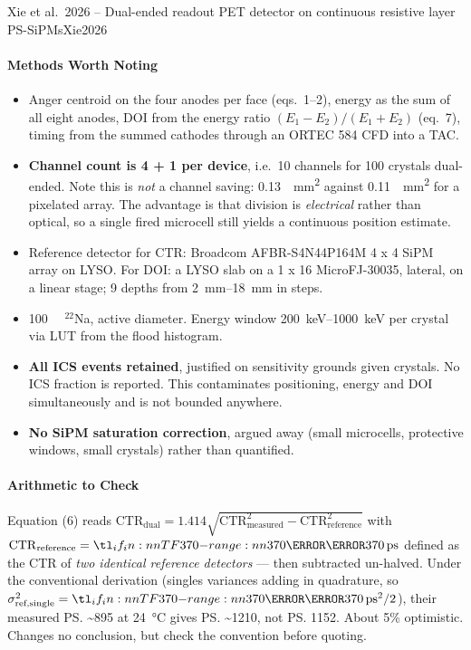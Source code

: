 \begin{papernote}{Xie et al.\ 2026 -- Dual-ended readout PET detector on continuous resistive layer PS-SiPMs}{Xie2026}
\paragraph{Methods Worth Noting}
\begin{itemize}
	\item Anger centroid on the four anodes per face (eqs.\ 1--2), energy as the
		sum of all eight anodes, DOI from the energy ratio
		$(E_1 - E_2)/(E_1 + E_2)$ (eq.\ 7), timing from the summed cathodes
		through an ORTEC 584 CFD into a TAC.
	\item \textbf{Channel count is 4 + 1 per device}, i.e.\ 10 channels for 100
		crystals dual-ended. Note this is \emph{not} a channel saving:
		\qty{0.13}{\per\milli\metre\squared} against
		\qty{0.11}{\per\milli\metre\squared} for a  pixelated array. The
		advantage is that division is \emph{electrical} rather than optical, so
		a single fired microcell still yields a continuous position estimate.
	\item Reference detector for CTR: Broadcom AFBR-S4N44P164M 4 x 4 SiPM array
		on  LYSO. For DOI: a
		 LYSO slab on a 1 x 16
		MicroFJ-30035, lateral, on a linear stage; 9 depths from
		\qtyrange{2}{18}{\milli\metre} in  steps.
	\item \qty{100}{\micro\curie} $^{22}$Na,  active diameter.
		Energy window \qtyrange{200}{1000}{\kilo\electronvolt} per crystal via
		LUT from the flood histogram.
	\item \textbf{All ICS events retained}, justified on sensitivity grounds
		given  crystals. No ICS fraction is reported. This contaminates
		positioning, energy and DOI simultaneously and is not bounded anywhere.
	\item \textbf{No SiPM saturation correction}, argued away (small microcells,
		 protective windows, small crystals) rather than quantified.
\end{itemize}
 
\paragraph{Arithmetic to Check}
Equation (6) reads
$\mathrm{CTR}_{\text{dual}} = 1.414\sqrt{\mathrm{CTR}_{\text{measured}}^2
- \mathrm{CTR}_{\text{reference}}^2}$
with $\mathrm{CTR}_{\text{reference}} = \ps{370}$ defined as the CTR of
\emph{two identical reference detectors} --- then subtracted un-halved. Under the
conventional derivation (singles variances adding in quadrature, so
$\sigma^2_{\text{ref,single}} = \ps{370}^2/2$), their measured \ps{\sim895} at
\qty{24}{\degreeCelsius} gives \ps{\sim1210}, not \ps{1152}. About 5\%
optimistic. Changes no conclusion, but check the convention before quoting.
 

\end{papernote}
